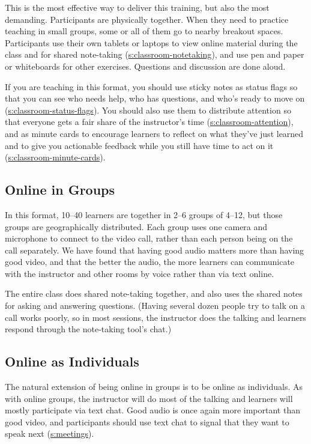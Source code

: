 This is the most effective way to deliver this training, but also the
most demanding. Participants are physically together. When they need to
practice teaching in small groups, some or all of them go to nearby
breakout spaces. Participants use their own tablets or laptops to view
online material during the class and for shared note-taking
(\protect\hyperlink{SECTION}{s:classroom-notetaking}), and use pen and paper or
whiteboards for other exercises. Questions and discussion are done
aloud.

If you are teaching in this format, you should use sticky notes as
status flags so that you can see who needs help, who has questions,
and who's ready to move on (\protect\hyperlink{SECTION}{s:classroom-status-flags}). You
should also use them to distribute attention so that everyone gets a
fair share of the instructor's time
(\protect\hyperlink{SECTION}{s:classroom-attention}), and as minute cards to encourage
learners to reflect on what they've just learned and to give you
actionable feedback while you still have time to act on it
(\protect\hyperlink{SECTION}{s:classroom-minute-cards}).

\subsection{Online in Groups}\label{online-in-groups}

In this format, 10--40 learners are together in 2--6 groups of 4--12, but
those groups are geographically distributed. Each group uses one camera
and microphone to connect to the video call, rather than each person
being on the call separately. We have found that having good audio
matters more than having good video, and that the better the audio, the
more learners can communicate with the instructor and other rooms by
voice rather than via text online.

The entire class does shared note-taking together, and also uses the
shared notes for asking and answering questions. (Having several dozen
people try to talk on a call works poorly, so in most sessions, the
instructor does the talking and learners respond through the note-taking
tool's chat.)

\subsection{Online as Individuals}\label{online-as-individuals}

The natural extension of being online in groups is to be online as
individuals. As with online groups, the instructor will do most of the
talking and learners will mostly participate via text chat. Good audio
is once again more important than good video, and participants should
use text chat to signal that they want to speak next
(\protect\hyperlink{APPENDIX}{s:meetings}).

